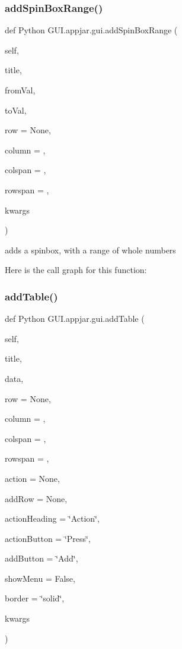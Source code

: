 \subsubsection{\texorpdfstring{add\+Spin\+Box\+Range()}{addSpinBoxRange()}}
{\footnotesize\ttfamily def Python G\+U\+I.\+appjar.\+gui.\+add\+Spin\+Box\+Range (\begin{DoxyParamCaption}\item[{}]{self,  }\item[{}]{title,  }\item[{}]{from\+Val,  }\item[{}]{to\+Val,  }\item[{}]{row = {\ttfamily None},  }\item[{}]{column = {},  }\item[{}]{colspan = {},  }\item[{}]{rowspan = {},  }\item[{}]{kwargs }\end{DoxyParamCaption})}

\begin{DoxyVerb}adds a spinbox, with a range of whole numbers \end{DoxyVerb}
 Here is the call graph for this function\+:
\mbox{\label{class_python_01_g_u_i_1_1appjar_1_1gui_afed5cffabe4edde6b5d18c2b8c5b3858}} 
\subsubsection{\texorpdfstring{add\+Table()}{addTable()}}
{\footnotesize\ttfamily def Python G\+U\+I.\+appjar.\+gui.\+add\+Table (\begin{DoxyParamCaption}\item[{}]{self,  }\item[{}]{title,  }\item[{}]{data,  }\item[{}]{row = {\ttfamily None},  }\item[{}]{column = {},  }\item[{}]{colspan = {},  }\item[{}]{rowspan = {},  }\item[{}]{action = {\ttfamily None},  }\item[{}]{add\+Row = {\ttfamily None},  }\item[{}]{action\+Heading = {\ttfamily \char`\"{}Action\char`\"{}},  }\item[{}]{action\+Button = {\ttfamily \char`\"{}Press\char`\"{}},  }\item[{}]{add\+Button = {\ttfamily \char`\"{}Add\char`\"{}},  }\item[{}]{show\+Menu = {\ttfamily False},  }\item[{}]{border = {\ttfamily \char`\"{}solid\char`\"{}},  }\item[{}]{kwargs }\end{DoxyParamCaption})}

